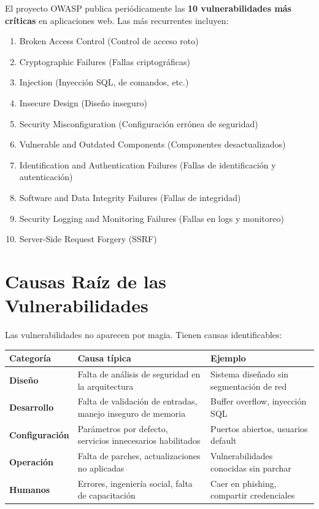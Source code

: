 \documentclass[11pt,a4paper]{article}
\begin{document}
\begin{ejemplo}
El proyecto OWASP publica periódicamente las \textbf{10 vulnerabilidades más críticas} en aplicaciones web. Las más recurrentes incluyen:
\begin{enumerate}[leftmargin=*]
  \item Broken Access Control (Control de acceso roto)
  \item Cryptographic Failures (Fallas criptográficas)
  \item Injection (Inyección SQL, de comandos, etc.)
  \item Insecure Design (Diseño inseguro)
  \item Security Misconfiguration (Configuración errónea de seguridad)
  \item Vulnerable and Outdated Components (Componentes desactualizados)
  \item Identification and Authentication Failures (Fallas de identificación y autenticación)
  \item Software and Data Integrity Failures (Fallas de integridad)
  \item Security Logging and Monitoring Failures (Fallas en logs y monitoreo)
  \item Server-Side Request Forgery (SSRF)
\end{enumerate}
\end{ejemplo}

\section{Causas Raíz de las Vulnerabilidades}
Las vulnerabilidades no aparecen por magia. Tienen causas identificables:

\begin{center}
\renewcommand{\arraystretch}{1.4}
\begin{tabularx}{\textwidth}{@{} p{3.5cm} X X @{}}
\toprule
\textbf{Categoría} & \textbf{Causa típica} & \textbf{Ejemplo} \\
\midrule
\textbf{Diseño} & Falta de análisis de seguridad en la arquitectura & Sistema diseñado sin segmentación de red \\
\midrule
\textbf{Desarrollo} & Falta de validación de entradas, manejo inseguro de memoria & Buffer overflow, inyección SQL \\
\midrule
\textbf{Configuración} & Parámetros por defecto, servicios innecesarios habilitados & Puertos abiertos, usuarios default \\
\midrule
\textbf{Operación} & Falta de parches, actualizaciones no aplicadas & Vulnerabilidades conocidas sin parchar \\
\midrule
\textbf{Humanos} & Errores, ingeniería social, falta de capacitación & Caer en phishing, compartir credenciales \\
\bottomrule
\end{tabularx}
\end{center}
\end{document}
